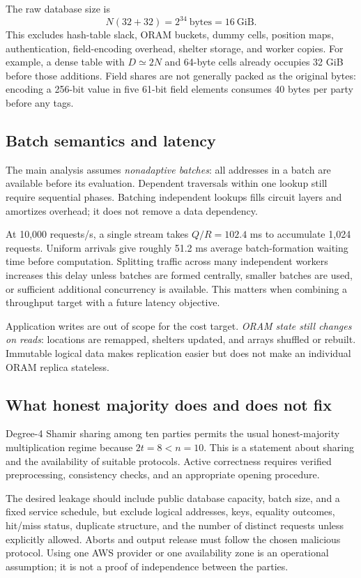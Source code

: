 \documentclass[11pt]{article}
\begin{document}
The raw database size is
\[
N(32+32)=2^{34}\ \text{bytes}=16\ \text{GiB}.
\]
This excludes hash-table slack, ORAM buckets, dummy cells, position maps,
authentication, field-encoding overhead, shelter storage, and worker copies.
For example, a dense table with $D\simeq 2N$ and 64-byte cells already occupies
32 GiB before those additions. Field shares are not generally packed as the
original bytes: encoding a 256-bit value in five 61-bit field elements consumes
40 bytes per party before any tags.

\subsection{Batch semantics and latency}

The main analysis assumes \emph{nonadaptive batches}: all addresses in a batch
are available before its evaluation. Dependent traversals within one lookup
still require sequential phases. Batching independent lookups fills circuit
layers and amortizes overhead; it does not remove a data dependency.

At 10,000 requests/s, a single stream takes $Q/R=102.4$ ms to accumulate 1,024
requests. Uniform arrivals give roughly 51.2 ms average batch-formation waiting
time before computation. Splitting traffic across many independent workers
increases this delay unless batches are formed centrally, smaller batches are
used, or sufficient additional concurrency is available. This matters when
combining a throughput target with a future latency objective.

Application writes are out of scope for the cost target. \emph{ORAM state still
changes on reads}: locations are remapped, shelters updated, and arrays shuffled
or rebuilt. Immutable logical data makes replication easier but does not make
an individual ORAM replica stateless.

\subsection{What honest majority does and does not fix}

Degree-4 Shamir sharing among ten parties permits the usual honest-majority
multiplication regime because $2t=8<n=10$. This is a statement about sharing and
the availability of suitable protocols. Active correctness requires verified
preprocessing, consistency checks, and an appropriate opening procedure.

The desired leakage should include public database capacity, batch size, and a
fixed service schedule, but exclude logical addresses, keys, equality outcomes,
hit/miss status, duplicate structure, and the number of distinct requests unless
explicitly allowed. Aborts and output release must follow the chosen malicious
protocol. Using one AWS provider or one availability zone is an operational
assumption; it is not a proof of independence between the parties.
\end{document}
